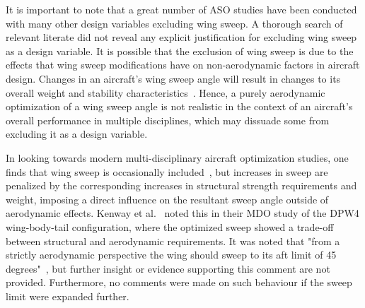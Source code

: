 It is important to note that a great number of ASO studies have been conducted with many other design variables excluding wing sweep. A thorough search of relevant literate did not reveal any explicit justification for excluding wing sweep as a design variable. It is possible that the exclusion of wing sweep is due to the effects that wing sweep modifications have on non-aerodynamic factors in aircraft design.
Changes in an aircraft's wing sweep angle will result in changes to its overall weight and stability characteristics~\cite{raymer_aircraft_2018}.
Hence, a purely aerodynamic optimization of a wing sweep angle is not realistic in the context of an aircraft's overall performance in multiple disciplines, which may dissuade some from excluding it as a design variable.\par

In looking towards modern multi-disciplinary aircraft optimization studies, one finds that wing sweep is occasionally included~\cite{jameson_aerodynamic_2003, kenway_cad-free_2010, jameson_multi-point_2007}, but increases in sweep are penalized by the corresponding increases in structural strength requirements and weight, imposing a direct influence on the resultant sweep angle outside of aerodynamic effects.
Kenway et al.~\cite{kenway_cad-free_2010} noted this in their MDO study of the DPW4 wing-body-tail configuration, where the optimized sweep showed a trade-off between structural and aerodynamic requirements. It was noted that "from a strictly aerodynamic perspective the wing should sweep to its aft limit of 45 degrees"~\cite{kenway_cad-free_2010}, but further insight or evidence supporting this comment are not provided. Furthermore, no comments were made on such behaviour if the sweep limit were expanded further. \par

